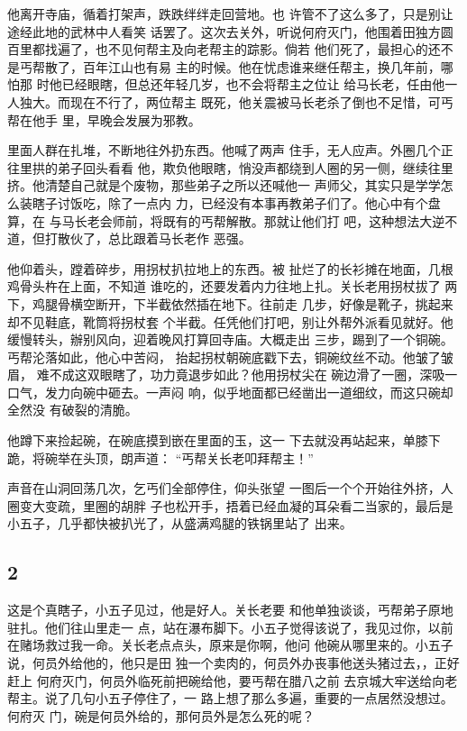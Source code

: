 他离开寺庙，循着打架声，跌跌绊绊走回营地。也
许管不了这么多了，只是别让途经此地的武林中人看笑
话罢了。这次去关外，听说何府灭门，他围着田独方圆
百里都找遍了，也不见何帮主及向老帮主的踪影。倘若
他们死了，最担心的还不是丐帮散了，百年江山也有易
主的时候。他在忧虑谁来继任帮主，换几年前，哪怕那
时他已经眼瞎，但总还年轻几岁，也不会将帮主之位让
给马长老，任由他一人独大。而现在不行了，两位帮主
既死，他关震被马长老杀了倒也不足惜，可丐帮在他手
里，早晚会发展为邪教。

里面人群在扎堆，不断地往外扔东西。他喊了两声
住手，无人应声。外圈几个正往里拱的弟子回头看看
他，欺负他眼瞎，悄没声都绕到人圈的另一侧，继续往里
挤。他清楚自己就是个废物，那些弟子之所以还喊他一
声师父，其实只是学学怎么装瞎子讨饭吃，除了一点内
力，已经没有本事再教弟子们了。他心中有个盘算，在
与马长老会师前，将既有的丐帮解散。那就让他们打
吧，这种想法大逆不道，但打散伙了，总比跟着马长老作
恶强。

他仰着头，蹚着碎步，用拐杖扒拉地上的东西。被
扯烂了的长衫摊在地面，几根鸡骨头杵在上面，不知道
谁吃的，还要发着内力往地上扎。关长老用拐杖拔了
两下，鸡腿骨横空断开，下半截依然插在地下。往前走
几步，好像是靴子，挑起来却不见鞋底，靴筒将拐杖套
个半截。任凭他们打吧，别让外帮外派看见就好。他
缓慢转头，辦别风向，迎着晚风打算回寺庙。大概走出
三步，踢到了一个铜碗。丐帮沦落如此，他心中苦闷，
抬起拐杖朝碗底戳下去，铜碗纹丝不动。他皱了皱眉，
难不成这双眼瞎了，功力竟退步如此？他用拐杖尖在
碗边滑了一圈，深吸一口气，发力向碗中砸去。一声闷
响，似乎地面都已经凿出一道细纹，而这只碗却全然没
有破裂的清脆。

他蹲下来捡起碗，在碗底摸到嵌在里面的玉，这一
下去就没再站起来，单膝下跪，将碗举在头顶，朗声道：
“丐帮关长老叩拜帮主！”

声音在山洞回荡几次，乞丐们全部停住，仰头张望
一图后一个个开始往外挤，人圈变大变疏，里圈的胡胖
子也松开手，捂着已经血凝的耳朵看二当家的，最后是
小五子，几乎都快被扒光了，从盛满鸡腿的铁锅里站了
出来。
\newline

{\centering\subsection{2}}

这是个真瞎子，小五子见过，他是好人。关长老要
和他单独谈谈，丐帮弟子原地驻扎。他们往山里走一
点，站在瀑布脚下。小五子觉得该说了，我见过你，以前
在赌场救过我一命。关长老点点头，原来是你啊，他问
他碗从哪里来的。小五子说，何员外给他的，他只是田
独一个卖肉的，何员外办丧事他送头猪过去，，正好赶上
何府灭门，何员外临死前把碗给他，要丐帮在腊八之前
去京城大牢送给向老帮主。说了几句小五子停住了，一
路上想了那么多遍，重要的一点居然没想过。何府灭
门，碗是何员外给的，那何员外是怎么死的呢？

